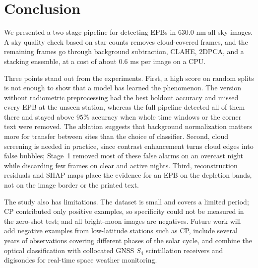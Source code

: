 \section{Conclusion}\label{sec:conclusion}

We presented a two-stage pipeline for detecting EPBs in $630.0\text{ nm}$ all-sky images. A sky quality check based on star counts removes cloud-covered frames, and the remaining frames go through background subtraction, CLAHE, 2DPCA, and a stacking ensemble, at a cost of about $0.6\text{ ms}$ per image on a CPU.

Three points stand out from the experiments. First, a high score on random splits is not enough to show that a model has learned the phenomenon. The version without radiometric preprocessing had the best holdout accuracy and missed every EPB at the unseen station, whereas the full pipeline detected all of them there and stayed above $95\%$ accuracy when whole time windows or the corner text were removed. The ablation suggests that background normalization matters more for transfer between sites than the choice of classifier. Second, cloud screening is needed in practice, since contrast enhancement turns cloud edges into false bubbles; Stage~1 removed most of these false alarms on an overcast night while discarding few frames on clear and active nights. Third, reconstruction residuals and SHAP maps place the evidence for an EPB on the depletion bands, not on the image border or the printed text.

The study also has limitations. The dataset is small and covers a limited period; CP contributed only positive examples, so specificity could not be measured in the zero-shot test; and all bright-moon images are negatives. Future work will add negative examples from low-latitude stations such as CP, include several years of observations covering different phases of the solar cycle, and combine the optical classification with collocated GNSS $S_4$ scintillation receivers and digisondes for real-time space weather monitoring.
